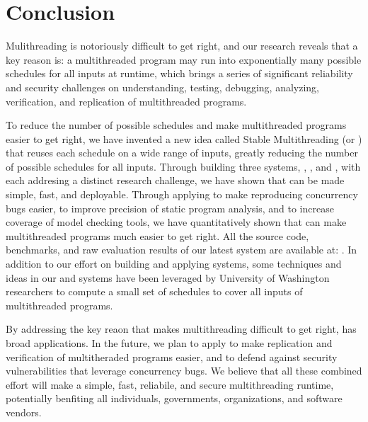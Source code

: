 \chapter{Conclusion} \label{sec:conclusion}

Mulithreading is notoriously difficult to get right, and our research reveals
that a key reason is: a multithreaded program may run into exponentially many
possible schedules for all inputs at runtime, which brings a series of
significant reliability and security challenges on understanding,
testing, debugging, analyzing, verification, and replication of multithreaded
programs.

To reduce the number of possible schedules and make multithreaded
programs easier to get right, we have invented a new idea called Stable
Multithreading (or \smt) that reuses each schedule on a wide range of inputs,
greatly reducing the number of possible schedules for all inputs. Through
building three \smt systems, \tern, \peregrine, and \parrot, with each addresing
a distinct research challenge, we have shown that \smt can be made simple, fast,
and deployable. Through applying \smt to make reproducing concurrency bugs
easier, to improve precision of static program analysis, and to increase
coverage of model checking tools, we have quantitatively shown that \smt can
make multithreaded programs much easier to get right. All the source code,
benchmarks, and raw evaluation results of our latest \smt system \parrot are
available at: \github. In addition to our effort on building and applying \smt
systems, some techniques and ideas in our \tern and \peregrine systems have been
leveraged by University of Washington researchers to compute a small set of
schedules to cover all inputs of multithreaded programs.

By addressing the key reaon that makes multithreading difficult to get right,
\smt has broad applications. In the future, we plan to apply \smt to make
replication and verification of multitheraded programs easier, and to defend
against security vulnerabilities that leverage concurrency bugs. We believe that
all these combined effort will make \smt a simple, fast, reliabile, and secure
multithreading runtime, potentially benfiting all individuals, governments,
organizations, and software vendors. 